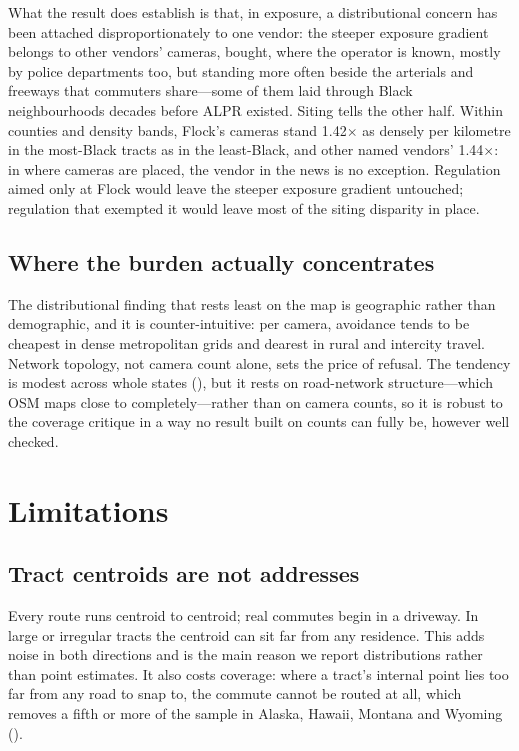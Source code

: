 \documentclass[11pt,twoside]{article}
\newcommand{\alpr}{ALPR\xspace}
\begin{document}
What the result does establish is that, in exposure, a distributional concern has been
attached disproportionately to one vendor: the steeper exposure gradient belongs to other
vendors' cameras, bought, where the operator is known, mostly by police departments too, but
standing more often beside
the arterials and freeways that commuters share---some of them laid through Black
neighbourhoods decades before \alpr existed. Siting tells the other half. Within
counties and density bands, Flock's cameras stand \num{1.42}$\times$ as densely per kilometre
in the most-Black tracts as in the least-Black, and other named vendors' \num{1.44}$\times$: in
where cameras are placed, the vendor in the news is no exception. Regulation aimed only at
Flock would leave the steeper exposure gradient untouched; regulation that exempted it would
leave most of the siting disparity in place.

\subsection{Where the burden actually concentrates}

The distributional finding that rests least on the map is geographic rather than
demographic, and it is counter-intuitive: per camera, avoidance tends to be cheapest in dense
metropolitan grids and dearest in rural and intercity travel. Network topology, not camera
count alone, sets the price of refusal. The tendency is modest across whole states
(), but it rests on road-network structure---which OSM maps close to
completely---rather than on camera counts, so it is robust to the coverage critique in a way no
result built on counts can fully be, however well checked.

\section{Limitations}
\label{sec:limitations}

\subsection{Tract centroids are not addresses}

Every route runs centroid to centroid; real commutes begin in a driveway. In large or
irregular tracts the centroid can sit far from any residence. This adds noise in both
directions and is the main reason we report distributions rather than point estimates. It
also costs coverage: where a tract's internal point lies too far from any road to snap to,
the commute cannot be routed at all, which removes a fifth or more of the sample in Alaska,
Hawaii, Montana and Wyoming ().
\end{document}

